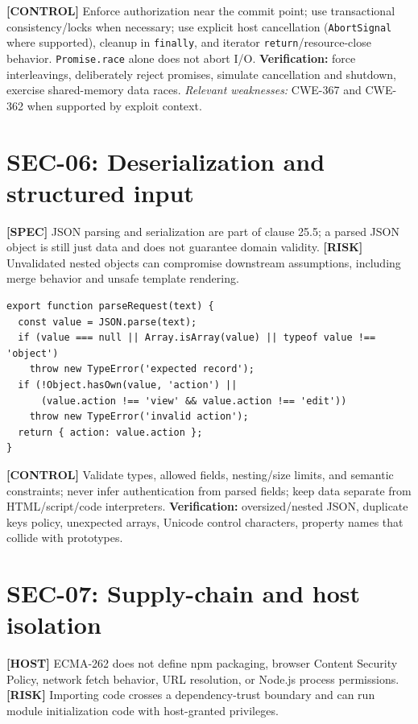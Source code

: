 \documentclass[11pt,letterpaper]{article}
\newcommand{\passthrough}[1]{#1}
\begin{document}
\textbf{{[}CONTROL{]}} Enforce authorization near the commit point; use transactional consistency/locks when necessary; use explicit host cancellation (\passthrough{\lstinline!AbortSignal!} where supported), cleanup in \passthrough{\lstinline!finally!}, and iterator \passthrough{\lstinline!return!}/resource-close behavior. \passthrough{\lstinline!Promise.race!} alone does not abort I/O. \textbf{Verification:} force interleavings, deliberately reject promises, simulate cancellation and shutdown, exercise shared-memory data races. \emph{Relevant weaknesses:} CWE-367 and CWE-362 when supported by exploit context.

\section{SEC-06: Deserialization and structured input}\label{sec-06-deserialization-and-structured-input}

\textbf{{[}SPEC{]}} JSON parsing and serialization are part of clause 25.5; a parsed JSON object is still just data and does not guarantee domain validity. \textbf{{[}RISK{]}} Unvalidated nested objects can compromise downstream assumptions, including merge behavior and unsafe template rendering.

\begin{lstlisting}
export function parseRequest(text) {
  const value = JSON.parse(text);
  if (value === null || Array.isArray(value) || typeof value !== 'object')
    throw new TypeError('expected record');
  if (!Object.hasOwn(value, 'action') ||
      (value.action !== 'view' && value.action !== 'edit'))
    throw new TypeError('invalid action');
  return { action: value.action };
}
\end{lstlisting}

\textbf{{[}CONTROL{]}} Validate types, allowed fields, nesting/size limits, and semantic constraints; never infer authentication from parsed fields; keep data separate from HTML/script/code interpreters. \textbf{Verification:} oversized/nested JSON, duplicate keys policy, unexpected arrays, Unicode control characters, property names that collide with prototypes.

\section{SEC-07: Supply-chain and host isolation}\label{sec-07-supply-chain-and-host-isolation}

\textbf{{[}HOST{]}} ECMA-262 does not define npm packaging, browser Content Security Policy, network fetch behavior, URL resolution, or Node.js process permissions. \textbf{{[}RISK{]}} Importing code crosses a dependency-trust boundary and can run module initialization code with host-granted privileges.
\end{document}
